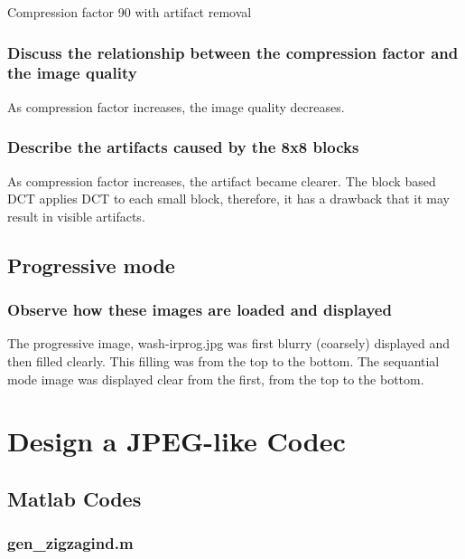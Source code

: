 \documentclass[12pt]{article}
\begin{document}
\begin{center}
Compression factor 90 with artifact removal\\
\end{center}

\subsubsection{Discuss the relationship between the compression factor and the image quality}

As compression factor increases, the image quality decreases. 

\subsubsection{Describe the artifacts caused by the 8x8 blocks}

As compression factor increases, the artifact became clearer. 
The block based DCT applies DCT to each small block, therefore, it has a drawback that it may result in visible artifacts. 

\subsection{Progressive mode}

\subsubsection{Observe how these images are loaded and displayed}

The progressive image, wash-irprog.jpg was first blurry (coarsely) displayed and then filled clearly. 
This filling was from the top to the bottom. 
The sequantial mode image was displayed clear from the first, from the top to the bottom. 

\section{Design a JPEG-like Codec}

\subsection{Matlab Codes}

\subsubsection{gen\_zigzagind.m}
\end{document}
